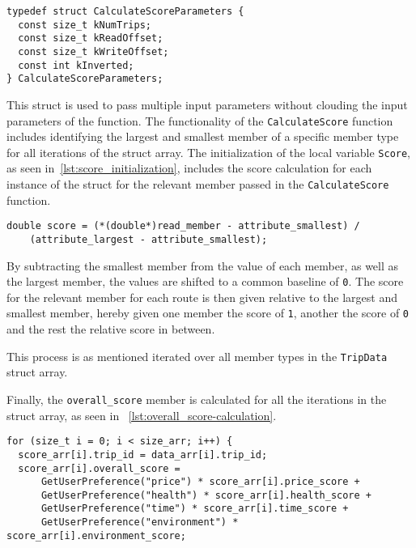 \begin{lstlisting}[caption={Declaration of \texttt{CalculateScoreParameters} struct},
    label={lst:CalculateScoreParameters-declaration}, captionpos=b]
typedef struct CalculateScoreParameters {
  const size_t kNumTrips;
  const size_t kReadOffset;
  const size_t kWriteOffset;
  const int kInverted;
} CalculateScoreParameters;
\end{lstlisting}

This struct is used to pass multiple input parameters without clouding the input parameters of the function.
The functionality of the \texttt{CalculateScore} function includes identifying the largest and smallest member of a
specific member type for all iterations of the struct array.
The initialization of the local variable \texttt{Score}, as seen in~\ref{lst:score_initialization}, includes the score
calculation for each instance of the struct for the relevant member passed in the \texttt{CalculateScore} function.

\begin{lstlisting}[caption={Initialization of \texttt{Score}}, label={lst:score_initialization}, captionpos=b]
double score = (*(double*)read_member - attribute_smallest) /
    (attribute_largest - attribute_smallest);
\end{lstlisting}

By subtracting the smallest member from the value of each member, as well as the largest member, the values are shifted
to a common baseline of \texttt{0}.
The score for the relevant member for each route is then given relative to the largest and smallest member, hereby
given one member the score of \texttt{1}, another the score of \texttt{0} and the rest the relative score in between.

This process is as mentioned iterated over all member types in the \texttt{TripData} struct array.

Finally, the \texttt{overall\_score} member is calculated for all the iterations in the struct array, as seen in
~\ref{lst:overall_score-calculation}.

\begin{lstlisting}[caption={Calculation of \texttt{overall\_score}}, label={lst:overall_score-calculation},
    captionpos=b]
for (size_t i = 0; i < size_arr; i++) {
  score_arr[i].trip_id = data_arr[i].trip_id;
  score_arr[i].overall_score =
      GetUserPreference("price") * score_arr[i].price_score +
      GetUserPreference("health") * score_arr[i].health_score +
      GetUserPreference("time") * score_arr[i].time_score +
      GetUserPreference("environment") * score_arr[i].environment_score;
\end{lstlisting}




